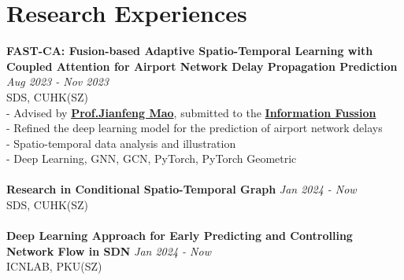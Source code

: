 \documentclass[a4paper,10pt]{article}
\begin{document}
\section*{Research Experiences}
\textbf{FAST-CA: Fusion-based Adaptive Spatio-Temporal Learning with Coupled Attention for Airport Network Delay Propagation Prediction} \hfill \textit{Aug 2023 - Nov 2023}\\
SDS, CUHK(SZ)\\
- Advised by \textbf{\href{https://sds.cuhk.edu.cn/en/teacher/268}{Prof.\@ Jianfeng Mao}}, submitted to the \textbf{\href{https://www.sciencedirect.com/journal/information-fusion}{Information Fussion}}\\
- Refined the deep learning model for the prediction of airport network delays\\
- Spatio-temporal data analysis and illustration\\
- Deep Learning, GNN, GCN, PyTorch, PyTorch Geometric\\
\\
\textbf{Research in Conditional Spatio-Temporal Graph} \hfill \textit{Jan 2024 - Now}\\
SDS, CUHK(SZ)\\
\\
\textbf{Deep Learning Approach for Early Predicting and Controlling Network Flow in SDN} \hfill \textit{Jan 2024 - Now}\\
ICNLAB, PKU(SZ)\\
\end{document}
